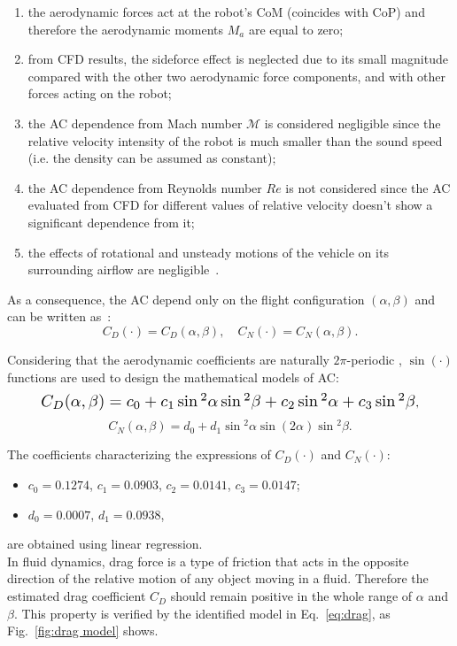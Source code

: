 \begin{enumerate}
\item the aerodynamic forces act at the robot's CoM (coincides with CoP) and therefore the aerodynamic moments ${M}_a$ are equal to zero;
\item from CFD results, the sideforce effect is neglected due to its small magnitude compared with the other two aerodynamic force components, and with other forces acting on the robot;
\item the AC dependence from Mach number $\mathcal{M}$ is considered negligible since the relative velocity intensity of the robot is much smaller than the sound speed (i.e. the density can be assumed as constant);
\item the AC dependence from Reynolds number $Re$ is not considered since the AC evaluated from CFD for different values of relative velocity doesn't show a significant dependence from it;
\item the effects of rotational and unsteady motions of the vehicle on its surrounding airflow are negligible~\cite{stengel2015flight}.
\end{enumerate}

As a consequence, the AC depend only on the flight configuration $(\alpha,\beta)$ and can be written as~\cite{pucci2015nonlinear}:
\begin{equation*}
    C_D(\cdot) =C_D(\alpha, \beta), \quad  C_N(\cdot) =C_N(\alpha, \beta) .
\end{equation*}

Considering that the aerodynamic coefficients are naturally $2\pi$-periodic \cite{didyk2012whole}, $\sin{(\cdot)}$ functions are used to design the mathematical models of AC: %
\begin{equation}
    \resizebox{.88 \columnwidth}{!}{$ 
        C_D(\alpha,\beta)= c_0 + c_1 \sin{^2 \alpha} \sin{^2\beta} + c_2 \sin{^2\alpha}  + c_3 \sin{^2\beta}
    $},\label{eq:drag}
 \end{equation}
 \begin{equation}
    C_N(\alpha,\beta)= d_0 + d_1 \sin{^2\alpha} \sin{(2\alpha)} \sin{^2\beta} .
    \label{eq:normal}
 \end{equation}

The coefficients characterizing the expressions of $C_D(\cdot)$ and $C_N(\cdot)$:
\begin{itemize}
    \item $c_0=0.1274$, $c_1=0.0903$, $c_2=0.0141$, $c_3=0.0147$;
    \item $d_0=0.0007$, $d_1=0.0938$,
\end{itemize}
\noindent
are obtained using linear regression. \\
In fluid dynamics, drag force is a type of friction that acts in the opposite direction of the relative motion of any object moving in a fluid. Therefore the estimated drag coefficient $C_D$ should remain positive in the whole range of $\alpha$ and $\beta$. This property is verified by the identified model in Eq.~\eqref{eq:drag}, as Fig.~\ref{fig:drag model} shows.

